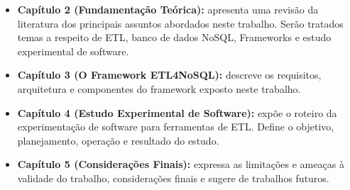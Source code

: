 \begin{itemize}
	\item \textbf{Capítulo 2 (Fundamentação Teórica):} apresenta uma revisão da literatura dos principais assuntos abordados neste trabalho. Serão tratados temas a respeito de ETL, banco de dados NoSQL, Frameworks e estudo experimental de software.
	
	\item \textbf{Capítulo 3 (O Framework ETL4NoSQL):} descreve os requisitos, arquitetura e componentes do framework exposto neste trabalho.
	
	\item \textbf{Capítulo 4 (Estudo Experimental de Software):} expõe o roteiro da experimentação de software para ferramentas de ETL. Define o objetivo, planejamento, operação e resultado do estudo.
	
	\item \textbf{Capítulo 5 (Considerações Finais):} expressa as limitações e ameaças à validade do trabalho, considerações finais e sugere de trabalhos futuros.	
	
\end{itemize}

